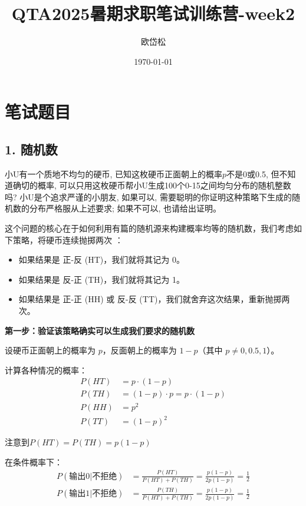 \documentclass[UTF8]{ctexart}
\title{QTA2025暑期求职笔试训练营-week2}
\author{欧岱松}
\date{\today{}}
\begin{document}
\maketitle

\section*{笔试题目}

\subsection*{1. 随机数}
小U有一个质地不均匀的硬币, 已知这枚硬币正面朝上的概率$p$不是0或0.5, 但不知道确切的概率, 可以只用这枚硬币帮小U生成100个0-15之间均匀分布的随机整数吗? 小U是个追求严谨的小朋友, 如果可以, 需要聪明的你证明这种策略下生成的随机数的分布严格服从上述要求; 如果不可以, 也请给出证明。

这个问题的核心在于如何利用有篇的随机源来构建概率均等的随机数，我们考虑如下策略，将硬币连续抛掷两次 ：
\begin{itemize}
    \item 如果结果是 正-反 (HT)，我们就将其记为 0。

    \item 如果结果是 反-正 (TH)，我们就将其记为 1。
    
    \item 如果结果是 正-正 (HH) 或 反-反 (TT)，我们就舍弃这次结果，重新抛掷两次。    
    
\end{itemize}

\textbf{第一步：验证该策略确实可以生成我们要求的随机数}

设硬币正面朝上的概率为 $p$，反面朝上的概率为 $1-p$（其中 $p \neq 0, 0.5, 1$）。

计算各种情况的概率：
\begin{align}
P(HT) &= p \cdot (1-p) \\
P(TH) &= (1-p) \cdot p = p \cdot (1-p) \\
P(HH) &= p^2 \\
P(TT) &= (1-p)^2
\end{align}

注意到$P(HT) = P(TH) = p(1-p)$

在条件概率下：
\begin{align}
P(\text{输出0} | \text{不拒绝}) &= \frac{P(HT)}{P(HT) + P(TH)} =
\frac{p(1-p)}{2p(1-p)} = \frac{1}{2} \\
P(\text{输出1} | \text{不拒绝}) &= \frac{P(TH)}{P(HT) + P(TH)} =
\frac{p(1-p)}{2p(1-p)} = \frac{1}{2}
\end{align}
\end{document}
